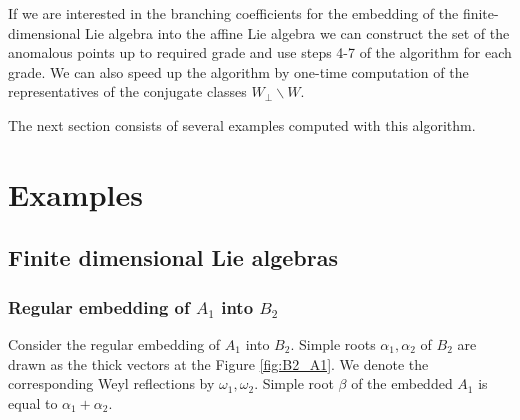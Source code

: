 \documentclass[a4paper,12pt]{article}
\theoremstyle{definition} \newtheorem{Def}{Definition}
\begin{document}
If we are interested in the branching coefficients for the embedding of the finite-dimensional Lie algebra into the affine Lie algebra we can construct the set of the anomalous points up to required grade and use steps 4-7 of the algorithm for each grade. We can also speed up the algorithm by one-time computation of the representatives of the conjugate classes $W_{\bot}\backslash W$.

The next section consists of several examples computed with this algorithm. 

\section{Examples}
\label{sec:examples}

\subsection{Finite dimensional Lie algebras}
\label{sec:finite-dimens-lie}

\subsubsection{Regular embedding of $A_1$ into $B_2$}
\label{sec:regul-embedd-a_1}

Consider the regular embedding of $A_1$ into $B_2$. Simple roots $\alpha_1, \alpha_2$ of $B_2$ are drawn as the thick vectors at the Figure \ref{fig:B2_A1}. We denote the corresponding Weyl reflections by $\omega_1, \omega_2$. Simple root $\beta$ of the embedded $A_1$ is equal to $\alpha_1+\alpha_2$.
\end{document}
